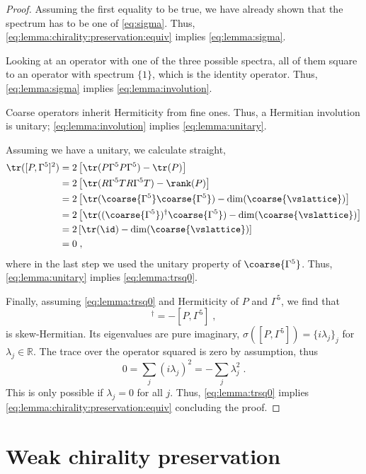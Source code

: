 \begin{proof}
Assuming the first equality to be true, we have already shown that the spectrum has to be one of \cref{eq:sigma}.
Thus, \cref{eq:lemma:chirality:preservation:equiv} implies \cref{eq:lemma:sigma}.

Looking at an operator with one of the three possible spectra, all of them square to an operator with spectrum $\{1\}$, which is the identity operator.
Thus, \cref{eq:lemma:sigma} implies \cref{eq:lemma:involution}.

Coarse operators inherit Hermiticity from fine ones.
Thus, a Hermitian involution is unitary; \cref{eq:lemma:involution} implies \cref{eq:lemma:unitary}.

Assuming we have a unitary, we calculate straight,
\begin{align}
\tr([P, \Gamma^{5}]^{2})
&= 2 \left[ \tr(P \Gamma^{5} P \Gamma^{5})  - \tr(P) \right] \\
&= 2 \left[ \tr(R \Gamma^{5} T R \Gamma^{5} T)  - \rank(P) \right] \\
&= 2 \left[ \tr( \coarse{\Gamma^{5}} \coarse{\Gamma^{5}} )  - \dim(\coarse{\vslattice}) \right] \\
&= 2 \left[ \tr( (\coarse{\Gamma^{5}})^{\dagger} \coarse{\Gamma^{5}} )  - \dim(\coarse{\vslattice}) \right] \\
&= 2 \left[ \tr( \id )  - \dim(\coarse{\vslattice}) \right] \\
&= 0 \;,
\end{align}
where in the last step we used the unitary property of $\coarse{\Gamma^{5}}$.
Thus, \cref{eq:lemma:unitary} implies \cref{eq:lemma:trsq0}.

Finally, assuming \cref{eq:lemma:trsq0} and Hermiticity of $P$ and $\Gamma^{5}$, we find that
\begin{equation}
[P, \Gamma^{5}]^{\dagger} = - [P, \Gamma^{5}] \;,
\end{equation}
is skew-Hermitian.
Its eigenvalues are pure imaginary, $\sigma([P, \Gamma^{5}]) = \{ i \lambda_j\}_j$ for $\lambda_j \in \mathbb{R}$.
The trace over the operator squared is zero by assumption, thus
\begin{equation}
0 = \sum_{j} (i \lambda_j)^2 = - \sum_{j} \lambda_j^2 \;.
\end{equation}
This is only possible if $\lambda_j=0$ for all $j$.
Thus, \cref{eq:lemma:trsq0} implies \cref{eq:lemma:chirality:preservation:equiv} concluding the proof.
\end{proof}

\section{Weak chirality preservation}

